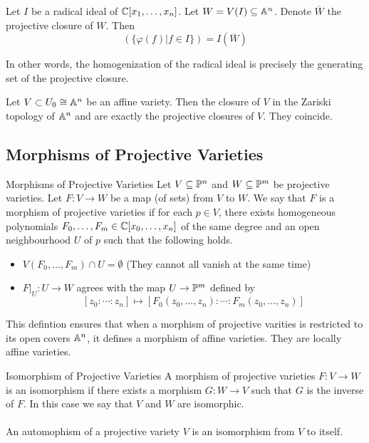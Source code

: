 \documentclass[a4paper]{article}
\begin{document}
\begin{prp}{}{} Let $I$ be a radical ideal of $\mathbb{C}[x_1,\dots,x_n]$. Let $W=V(I)\subseteq\mathbb{A}^n$. Denote $\overline{W}$ the projective closure of $W$. Then $$(\{\varphi(f)|f\in I\})=I(\overline{W})$$
\end{prp}

In other words, the homogenization of the radical ideal is precisely the generating set of the projective closure. 


\begin{prp}{}{} Let $V\subset U_0\cong\mathbb{A}^n$ be an affine variety. Then the closure of $V$ in the Zariski topology of $\mathbb{A}^n$ and are exactly the projective closures of $V$. They coincide. 
\end{prp}

\subsection{Morphisms of Projective Varieties}
\begin{defn}{Morphisms of Projective Varieties}{} Let $V\subseteq\mathbb{P}^n$ and $W\subseteq\mathbb{P}^m$ be projective varieties. Let $F:V\to W$ be a map (of sets) from $V$ to $W$. We say that $F$ is a morphism of projective varieties if for each $p\in V$, there exists homogeneous polynomials $F_0,\dots,F_m\in\mathbb{C}[x_0,\dots,x_n]$ of the same degree and an open neighbourhood $U$ of $p$ such that the following holds. 
\begin{itemize}
\item $V(F_0,\dots,F_m)\cap U=\emptyset$ (They cannot all vanish at the same time)
\item $F|_U:U\to W$ agrees with the map $U\to\mathbb{P}^m$ defined by $$[z_0:\cdots:z_n]\mapsto[F_0(z_0,\dots,z_n):\cdots:F_m(z_0,\dots,z_n)]$$
\end{itemize}
\end{defn}

This defintion ensures that when a morphism of projective varities is restricted to its open covers $\mathbb{A}^n$, it defines a morphism of affine varieties. They are locally affine varieties. 

\begin{defn}{Isomorphism of Projective Varieties}{} A morphism of projective varieties $F:V\to W$ is an isomorphism if there exists a morphism $G:W\to V$ such that $G$ is the inverse of $F$. In this case we say that $V$ and $W$ are isomorphic. \\~\\
An automophism of a projective variety $V$ is an isomorphism from $V$ to itself. 
\end{defn}
\end{document}
